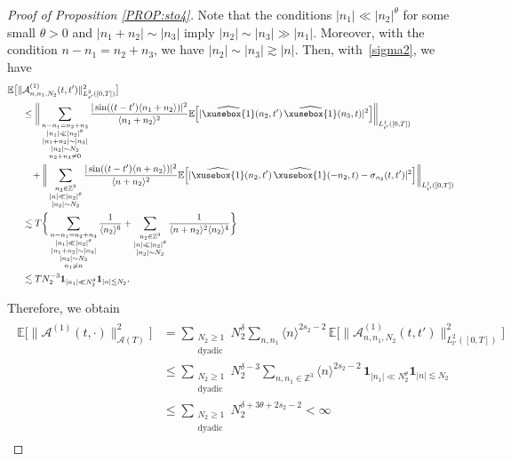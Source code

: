 \documentclass[%
11pt,  reqno]{amsart}
\def\<#1>{\xusebox{#1}}
\newcommand{\1}{\hspace{0.2mm}\text{I}\hspace{0.2mm}}
\newcommand{\noi}{\noindent}
\newcommand{\Z}{\mathbb{Z}}
\newcommand{\E}{\mathbb{E}}
\newcommand{\dl}{\delta}
\newcommand{\s}{\sigma}
\newcommand{\ft}{\widehat}
\newcommand{\les}{\lesssim}
\newcommand{\ges}{\gtrsim}
\newcommand{\jb}[1]
{\langle #1 \rangle}
\newcommand{\ind}{\mathbf 1}
\newcommand{\A}{\mathcal{A}}
\numberwithin{equation}{section}
\numberwithin{theorem}{section}
\begin{document}
\begin{proof}[Proof of Proposition \ref{PROP:sto4}]
Note that the conditions $|n_1| \ll |n_2|^\theta$ for some small $\theta > 0$
and $|n_1 + n_2|\sim |n_3|$ imply $|n_2| \sim |n_3| \gg |n_1|$.
Moreover, with the condition $n - n_1 =  n_2 + n_3$, 
we have $|n_2| \sim |n_3| \ges |n|$.
Then, with~\eqref{sigma2}, we have
\begin{align}
 \E\big[\| & \A_{n, n_1, N_2}^{(1)}  (t, t')\|_{L^2_{t'}([0, T])}^2\big]\notag \\
& \leq\bigg\|\sum_{\substack{n - n_1 =  n_2 + n_3\\ |n_1| \ll |n_2|^\theta \\ |n_1 + n_2|\sim |n_3|\\
|n_2| \sim N_2\\n_2+n_3 \ne 0}}
 \frac{|\sin ((t - t') \jb{ n_1 + n_2 })|^2}{\jb{ n_1 + n_2 }^2} 
\E\Big[   | \ft{\<1>}(n_2, t') \, \ft{\<1>}(n_3, t) |^2\Big] \bigg\|_{L^1_{t'}([0, T])}\notag \\ 
& \hphantom{X}
+\bigg\|\sum_{\substack{n_2 \in \Z^3 \\ |n| \ll |n_2|^\theta\\|n_2| \sim N_2}}
  \frac{|\sin ((t - t') \jb{ n + n_2 })|^2}{\jb{ n + n_2 }^2} 
\E\Big[| \ft{\<1>}(n_2, t') \, \ft{\<1>}(-n_2, t) - \s_{n_2}(t, t')|^2\Big]  \bigg\|_{L^1_{t'}([0, T])}\notag \\
& \les T\bigg\{
\sum_{\substack{n - n_1 =  n_2 + n_3\\ |n_1| \ll |n_2|^\theta \\ |n_1 + n_2|\sim |n_3|\\
|n_2|\sim N_2\\n_1\ne n}}
\frac{1}{\jb{n_2}^6}
+ \sum_{\substack{n_2 \in \Z^3 \\ |n| \ll |n_2|^\theta\\|n_2| \sim N_2}}
\frac{1}{\jb{n+ n_2}^2 \jb{n_2}^4}
\bigg\} \notag \\
& \les TN_2^{-3} \ind_{|n_1|\ll N_2^\theta} \ind_{ |n| \les  N_2}.
\label{A1}
\end{align}


\noi
Therefore, we obtain
\begin{align}
\begin{split}
\E\big[\|\A^{(1)} (t, \cdot)\|_{\A(T)}^2\big] 
& = \sum_{\substack{N_2\geq 1\\ \text{dyadic}}} N_2^\dl \sum_{n,n_1}
\jb{n}^{2s_2-2}   \, \E\big[\|  \A_{n, n_1, N_2}^{(1)}  (t, t')\|_{L^2_{t'}([0, T])}^2\big] \\
& \leq \sum_{\substack{N_2\geq 1\\ \text{dyadic}}} 
N_2^{\dl-3} \sum_{n,n_1 \in \Z^3}
\jb{n}^{2s_2-2} \, \ind_{|n_1|\ll N_2^\theta} \ind_{ |n| \les  N_2} \\
& \leq \sum_{\substack{N_2\geq 1\\ \text{dyadic}}} N_2^{\dl+3\theta+2s_2-2} < \infty
\end{split}
\label{A1bis}
\end{align}



\end{proof}
\end{document}
